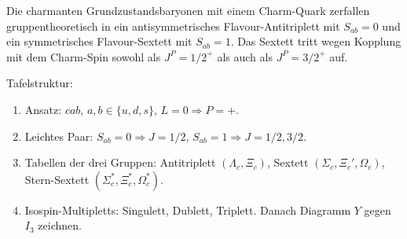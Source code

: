 \documentclass[11pt,a4paper]{scrartcl}
\begin{document}
\begin{answerbox}[title={Kommentar zu den charmanten Baryonen}]
Die charmanten Grundzustandsbaryonen mit einem Charm-Quark zerfallen gruppentheoretisch in ein antisymmetrisches Flavour-Antitriplett mit \(S_{ab}=0\) und ein symmetrisches Flavour-Sextett mit \(S_{ab}=1\). Das Sextett tritt wegen Kopplung mit dem Charm-Spin sowohl als \(J^P=1/2^+\) als auch als \(J^P=3/2^+\) auf.
\end{answerbox}

\begin{talkbox}[title={Tafelvortrag zu Aufgabe 3}]
Tafelstruktur:
\begin{enumerate}
\item Ansatz: \(cab\), \(a,b\in\{u,d,s\}\), \(L=0\Rightarrow P=+\).
\item Leichtes Paar: \(S_{ab}=0\Rightarrow J=1/2\), \(S_{ab}=1\Rightarrow J=1/2,3/2\).
\item Tabellen der drei Gruppen: Antitriplett \((\Lambda_c,\Xi_c)\), Sextett \((\Sigma_c,\Xi_c',\Omega_c)\), Stern-Sextett \((\Sigma_c^\ast,\Xi_c^\ast,\Omega_c^\ast)\).
\item Isospin-Multipletts: Singulett, Dublett, Triplett. Danach Diagramm \(Y\) gegen \(I_3\) zeichnen.
\end{enumerate}
\end{talkbox}
\end{document}
